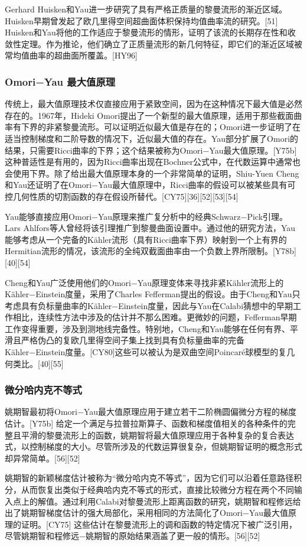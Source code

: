 Gerhard Huisken和Yau进一步研究了具有严格正质量的黎曼流形的渐近区域。Huisken早期曾发起了欧几里得空间超曲面体积保持均值曲率流的研究。[51] Huisken和Yau将他的工作适应于黎曼流形的情形，证明了该流的长期存在性和收敛性定理。作为推论，他们确立了正质量流形的新几何特征，即它们的渐近区域被常均值曲率的超曲面所覆盖。[HY96]
\subsubsection{Omori−Yau 最大值原理}  
传统上，最大值原理技术仅直接应用于紧致空间，因为在这种情况下最大值是必然存在的。1967年，Hideki Omori提出了一个新型的最大值原理，适用于那些截面曲率有下界的非紧黎曼流形。可以证明近似最大值是存在的；Omori进一步证明了在适当控制梯度和二阶导数的情况下，近似最大值的存在。Yau部分扩展了Omori的结果，只需要Ricci曲率的下界；这个结果被称为Omori−Yau最大值原理。[Y75b]这种普适性是有用的，因为Ricci曲率出现在Bochner公式中，在代数运算中通常也会使用下界。除了给出最大值原理本身的一个非常简单的证明，Shiu-Yuen Cheng和Yau还证明了在Omori−Yau最大值原理中，Ricci曲率的假设可以被某些具有可控几何性质的切割函数的存在假设所替代。[CY75][36][52][53][54]

Yau能够直接应用Omori−Yau原理来推广复分析中的经典Schwarz−Pick引理。Lars Ahlfors等人曾经将该引理推广到黎曼曲面设置中。通过他的研究方法，Yau能够考虑从一个完备的Kähler流形（具有Ricci曲率下界）映射到一个上有界的Hermitian流形的情况，该流形的全纯双截面曲率由一个负数上界所限制。[Y78b][40][54]

Cheng和Yau广泛使用他们的Omori−Yau原理变体来寻找非紧Kähler流形上的Kähler−Einstein度量，采用了Charles Fefferman提出的假设。由于Cheng和Yau只考虑具有负标量曲率的Kähler−Einstein度量，因此与Yau在Calabi猜想中的早期工作相比，连续性方法中涉及的估计并不那么困难。更微妙的问题，Fefferman早期工作变得重要，涉及到测地线完备性。特别地，Cheng和Yau能够在任何有界、平滑且严格伪凸的复欧几里得空间子集上找到具有负标量曲率的完备Kähler−Einstein度量。[CY80]这些可以被认为是双曲空间Poincaré球模型的复几何类比。[40][55]
\subsubsection{微分哈内克不等式}
姚期智最初将Omori−Yau最大值原理应用于建立若干二阶椭圆偏微分方程的梯度估计。[Y75b] 给定一个满足与拉普拉斯算子、函数和梯度值相关的各种条件的完整且平滑的黎曼流形上的函数，姚期智将最大值原理应用于各种复杂的复合表达式，以控制梯度的大小。尽管所涉及的代数运算很复杂，但姚期智证明的概念形式却异常简单。[56][52]

姚期智的新颖梯度估计被称为“微分哈内克不等式”，因为它们可以沿着任意路径积分，从而恢复出类似于经典哈内克不等式的形式，直接比较微分方程在两个不同输入点上的解值。通过利用Calabi对黎曼流形上距离函数的研究，姚期智和程修远给出了姚期智梯度估计的强大局部化，采用相同的方法简化了Omori−Yau最大值原理的证明。[CY75] 这些估计在黎曼流形上的调和函数的特定情况下被广泛引用，尽管姚期智和程修远−姚期智的原始结果涵盖了更一般的情形。[56][52]


